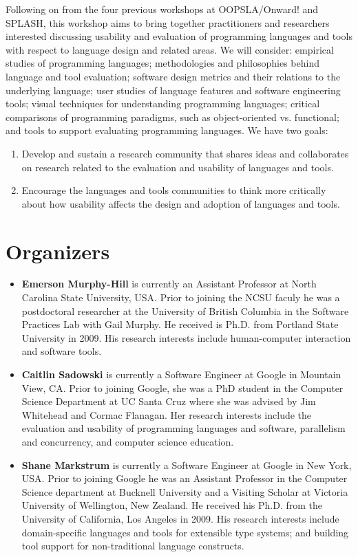 \documentclass{sigplanconf}
\begin{document}
Following on from the four previous workshops at OOPSLA/Onward! 
and SPLASH, this workshop aims to bring together practitioners and
researchers interested discussing usability and evaluation of
programming languages and tools with respect to language design and
related areas. We will consider: empirical studies of programming
languages; methodologies and philosophies behind language and tool
evaluation; software design metrics and their relations to the
underlying language; user studies of language features and software
engineering tools; visual techniques for understanding programming
languages; critical comparisons of programming paradigms, such as
object-oriented vs. functional; and tools to support evaluating
programming languages. We have two goals:

\begin{enumerate}
  \item 
Develop and sustain a research community that shares ideas and collaborates on 
research related to the evaluation and usability of languages and tools.
\item
Encourage the languages and tools communities to think more critically
about how usability affects the  design and adoption of languages and tools.
\end{enumerate}


\section{Organizers}

\begin{itemize}
  
\item \textbf{Emerson Murphy-Hill} is currently an Assistant Professor at North Carolina State University, USA. Prior to joining the NCSU faculy he was a postdoctoral researcher at the University of British Columbia in the Software Practices Lab with Gail Murphy. 
  He received is Ph.D. from Portland State University in 2009.
  His research interests include human-computer interaction and software tools. 

\item \textbf{Caitlin Sadowski} is currently a Software Engineer at Google in Mountain View, CA.
  Prior to joining Google, she was a PhD student in the 
  Computer Science Department at UC Santa Cruz where she was advised by Jim Whitehead and Cormac Flanagan. 
  Her research interests include the evaluation and usability of programming languages and software, parallelism and concurrency, and computer science education.
  
 \item \textbf{Shane Markstrum} is currently a Software Engineer at Google in New York, USA. Prior to joining Google he was an Assistant Professor in the Computer Science
  department at Bucknell University and a Visiting Scholar at Victoria University of Wellington, New Zealand. He received his Ph.D. from the University of
  California, Los Angeles in 2009. His research interests include
  domain-specific languages and tools for extensible type systems; and 
  building tool support for non-traditional language constructs.
\end{itemize}
\end{document}
